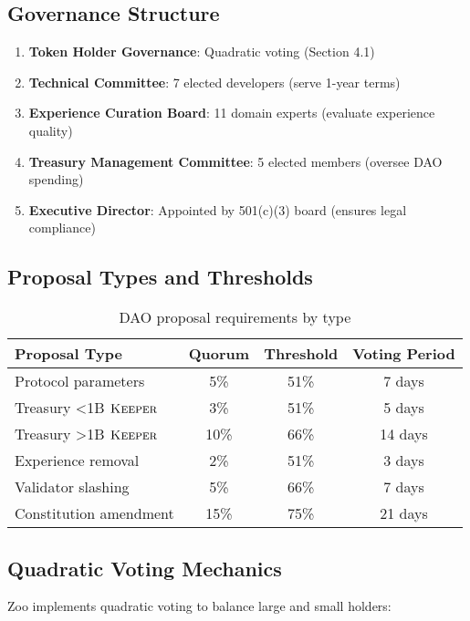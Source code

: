\documentclass[11pt,letterpaper]{article}
\theoremstyle{definition}
\theoremstyle{remark}
\newcommand{\KEEPER}{\textsc{Keeper}}
\begin{document}
\subsection{Governance Structure}

\begin{enumerate}
\item \textbf{Token Holder Governance}: Quadratic voting (Section 4.1)
\item \textbf{Technical Committee}: 7 elected developers (serve 1-year terms)
\item \textbf{Experience Curation Board}: 11 domain experts (evaluate experience quality)
\item \textbf{Treasury Management Committee}: 5 elected members (oversee DAO spending)
\item \textbf{Executive Director}: Appointed by 501(c)(3) board (ensures legal compliance)
\end{enumerate}

\subsection{Proposal Types and Thresholds}

\begin{table}[h]
\centering
\begin{tabular}{lccc}
\toprule
\textbf{Proposal Type} & \textbf{Quorum} & \textbf{Threshold} & \textbf{Voting Period} \\
\midrule
Protocol parameters & 5\% & 51\% & 7 days \\
Treasury <1B $\KEEPER$ & 3\% & 51\% & 5 days \\
Treasury >1B $\KEEPER$ & 10\% & 66\% & 14 days \\
Experience removal & 2\% & 51\% & 3 days \\
Validator slashing & 5\% & 66\% & 7 days \\
Constitution amendment & 15\% & 75\% & 21 days \\
\bottomrule
\end{tabular}
\caption{DAO proposal requirements by type}
\label{tab:dao_proposals}
\end{table}

\subsection{Quadratic Voting Mechanics}

Zoo implements quadratic voting to balance large and small holders:
\end{document}
